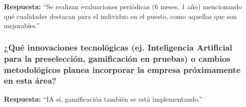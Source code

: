 \textbf{Respuesta:}\newline
``Se realizan evaluaciones periódicas (6 meses, 1 año) mencionando qué cualidades destacan para el individuo en el puesto, como aquellas que son mejorables.''

\subsubsection*{¿Qué innovaciones tecnológicas (ej. Inteligencia Artificial para la preselección, gamificación en pruebas) o cambios metodológicos planea incorporar la empresa próximamente en esta área?}

\textbf{Respuesta:}\newline
``IA sí, gamificación también se está implementando.''

